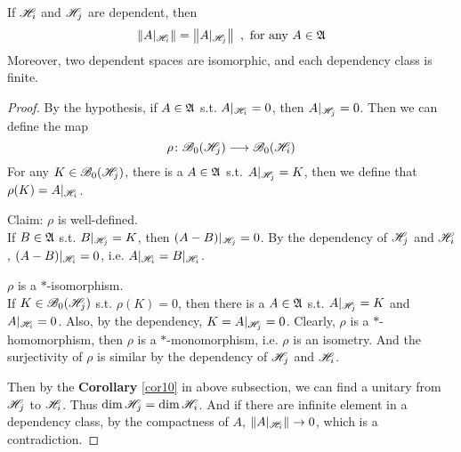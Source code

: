 \documentclass[a4paper,11pt]{report}
\begin{document}
\begin{prop}
	If $\mathscr{H}_i$ and $\mathscr{H}_j$ are dependent, then
	\begin{equation*}
		\left\lVert A|_{\mathscr{H}_i}\right\lVert = \left\lVert A|_{\mathscr{H}_j}\right\lVert~, \text{ for any } A \in \mathfrak{A}
	\end{equation*}
	Moreover, two dependent spaces are isomorphic, and each dependency class is finite.
\end{prop}
\begin{proof}
	By the hypothesis, if $A \in \mathfrak{A}$ s.t. $A|_{\mathscr{H}_i} = 0$, then $A|_{\mathscr{H}_j} = 0$. Then we can define the map
	\begin{equation*}
		\rho \colon  \mathscr{B}_0(\mathscr{H}_j)  \longrightarrow  \mathscr{B}_0(\mathscr{H}_i)
	\end{equation*}
	For any $K \in \mathscr{B}_0(\mathscr{H}_j)$, there is a $A \in \mathfrak{A}$ s.t. $A|_{\mathscr{H}_j} = K$, then we define that $\rho(K) = A|_{\mathscr{H}_i}$.
	\item Claim: $\rho$ is well-defined. \\
	If $B \in \mathfrak{A}$ s.t. $B|_{\mathscr{H}_j} = K$, then $(A-B)|_{\mathscr{H}_j} = 0$. By the dependency of $\mathscr{H}_j$ and $\mathscr{H}_i$, $(A-B)|_{\mathscr{H}_i} = 0$, i.e. $A|_{\mathscr{H}_i} = B|_{\mathscr{H}_i}$.
	\item $\rho$ is a $*$-isomorphism. \\
	If $K \in \mathscr{B}_0(\mathscr{H}_j)$ s.t. $\rho(K) = 0$, then there is a $A \in \mathfrak{A}$ s.t. $A|_{\mathscr{H}_j} = K$ and $A|_{\mathscr{H}_i} = 0$. Also, by the dependency, $K = A|_{\mathscr{H}_j} = 0$. Clearly, $\rho$ is a $*$-homomorphism, then $\rho$ is a $*$-monomorphism, i.e. $\rho$ is an isometry. And the surjectivity of $\rho$ is similar by the dependency of $\mathscr{H}_j$ and $\mathscr{H}_i$.
	\item Then by the \textbf{Corollary} \ref{cor10} in above subsection, we can find a unitary from $\mathscr{H}_j$ to $\mathscr{H}_i$. Thus $\dim{\mathscr{H}_j} = \dim{\mathscr{H}_i}$. And if there are infinite element in a dependency class, by the compactness of $A$, $\left\lVert A|_{\mathscr{H}_i}\right\lVert \rightarrow 0$, which is a contradiction.
\end{proof}
\end{document}
